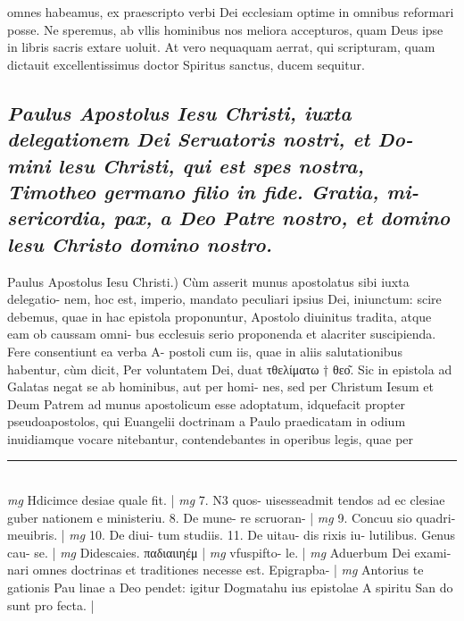 \documentclass{article}
\begin{document}
\begin{pages}
omnes habeamus, ex praescripto verbi Dei ecclesiam optime in omnibus reformari posse. Ne speremus, ab vllis hominibus nos meliora accepturos, quam Deus ipse in libris sacris extare uoluit. At vero nequaquam aerrat, qui scripturam, quam dictauit excellentissimus doctor Spiritus sanctus, ducem sequitur.  \pend
{}
{}
\subsection*{\textit{Paulus Apostolus Iesu Christi, iuxta delegationem Dei Seruatoris nostri, et Do- mini lesu Christi, qui est spes nostra, Timotheo germano filio in fide. Gratia, mi- sericordia, pax, a Deo Patre nostro, et domino lesu Christo domino nostro. }}\pstart Paulus Apostolus Iesu Christi.) Cùm asserit munus apostolatus sibi iuxta delegatio- nem, hoc est, imperio, mandato peculiari ipsius Dei, iniunctum: scire debemus, quae in hac epistola proponuntur, Apostolo diuinitus tradita, atque  eam ob caussam omni- bus ecclesuis serio proponenda et alacriter suscipienda. Fere consentiunt ea verba A- postoli cum iis, quae in aliis salutationibus habentur, cùm dicit, Per voluntatem Dei, duat τθελίματω † θεο͂. Sic in epistola ad Galatas negat se ab hominibus, aut per homi- nes, sed per Christum Iesum et Deum Patrem ad munus apostolicum esse adoptatum, idquefacit propter pseudoapostolos, qui Euangelii doctrinam a Paulo praedicatam in odium inuidiamque  vocare nitebantur, contendebantes in operibus legis, quae per  \pend
\vspace{0.5cm}\noindent
\vspace{0.2cm}\rule{1cm}{0.2pt}\\ 
\hspace{0.2cm}\textit{mg}
\footnotesize Hdicimce desiae quale fit. 
\normalsize| 
\hspace{0.2cm}\textit{mg}
\footnotesize 7. N3 quos- uisesseadmit tendos ad ec clesiae guber nationem e ministeriu. 8. De mune- re scruoran- 
\normalsize| 
\hspace{0.2cm}\textit{mg}
\footnotesize 9. Concuu sio quadri- meuibris. 
\normalsize| 
\hspace{0.2cm}\textit{mg}
\footnotesize 10. De diui- tum studiis. 11. De uitau- dis rixis iu- lutilibus. Genus cau- se. 
\normalsize| 
\hspace{0.2cm}\textit{mg}
\footnotesize Didescaies. παδιαιιηέμ 
\normalsize| 
\hspace{0.2cm}\textit{mg}
\footnotesize vfuspifto- le. 
\normalsize| 
\hspace{0.2cm}\textit{mg}
\footnotesize Aduerbum Dei exami- nari omnes doctrinas et traditiones necesse est. Epigrapba- 
\normalsize| 
\hspace{0.2cm}\textit{mg}
\footnotesize Antorius te gationis Pau linae a Deo pendet: igitur Dogmatahu ius epistolae A spiritu San do sunt pro fecta. 
\normalsize| 

\end{pages}
\end{document}
